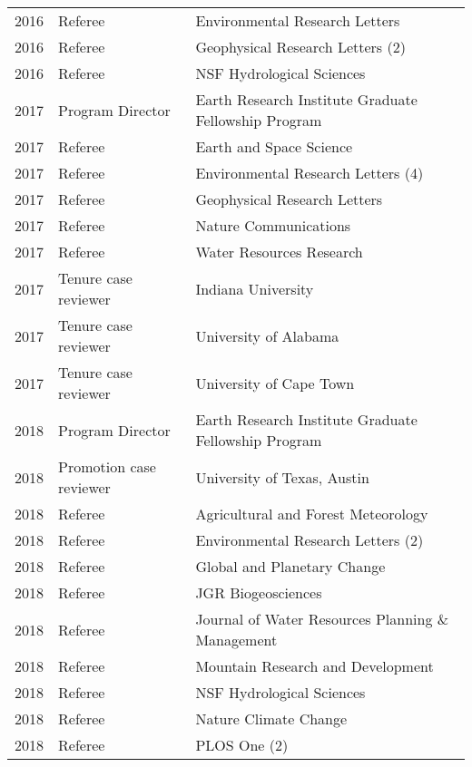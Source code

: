 
\begin{supertabular}{llp{12cm}}
2016 & Referee & Environmental Research Letters   \\
2016 & Referee & Geophysical Research Letters  (2) \\
2016 & Referee & NSF Hydrological Sciences   \\
2017 & Program Director & Earth Research Institute Graduate Fellowship Program   \\
2017 & Referee & Earth and Space Science   \\
2017 & Referee & Environmental Research Letters  (4) \\
2017 & Referee & Geophysical Research Letters   \\
2017 & Referee & Nature Communications   \\
2017 & Referee & Water Resources Research   \\
2017 & Tenure case reviewer & Indiana University   \\
2017 & Tenure case reviewer & University of Alabama   \\
2017 & Tenure case reviewer & University of Cape Town   \\
2018 & Program Director & Earth Research Institute Graduate Fellowship Program   \\
2018 & Promotion case reviewer & University of Texas, Austin   \\
2018 & Referee & Agricultural and Forest Meteorology   \\
2018 & Referee & Environmental Research Letters  (2) \\
2018 & Referee & Global and Planetary Change   \\
2018 & Referee & JGR Biogeosciences   \\
2018 & Referee & Journal of Water Resources Planning \& Management   \\
2018 & Referee & Mountain Research and Development    \\
2018 & Referee & NSF Hydrological Sciences   \\
2018 & Referee & Nature Climate Change   \\
2018 & Referee & PLOS One  (2) \\
\end{supertabular}

